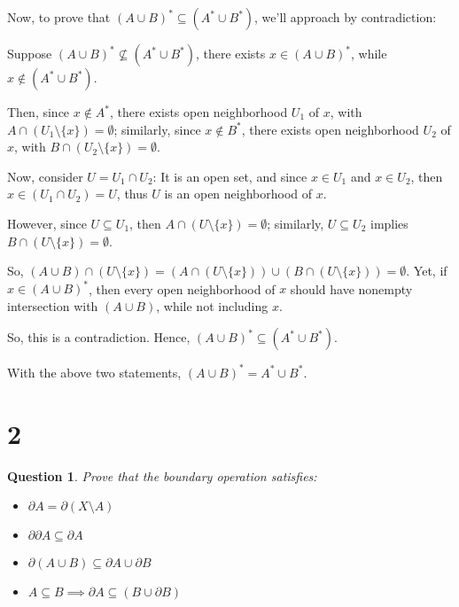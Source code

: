 \documentclass{article}
\newtheorem{question}{Question}
\begin{document}
\begin{itemize}
    \hfill

    Now, to prove that $(A\cup B)^* \subseteq (A^*\cup B^*)$, we'll approach by contradiction:

    Suppose $(A\cup B)^*\not\subseteq (A^*\cup B^*)$, there exists $x\in (A\cup B)^*$, while $x\notin (A^*\cup B^*)$.

    Then, since $x\notin A^*$, there exists open neighborhood $U_1$ of $x$, with $A\cap (U_1\setminus\{x\})=\emptyset$;
    similarly, since $x\notin B^*$, there exists open neighborhood $U_2$ of $x$, with $B\cap (U_2\setminus\{x\})=\emptyset$.

    Now, consider $U=U_1\cap U_2$: It is an open set, and since $x\in U_1$ and $x\in U_2$, then $x\in (U_1\cap U_2)=U$, thus $U$ is an open neighborhood of $x$.

    However, since $U\subseteq U_1$, then $A\cap (U\setminus\{x\})=\emptyset$; similarly, $U\subseteq U_2$ implies $B\cap (U\setminus\{x\})=\emptyset$.

    So, $(A\cup B)\cap (U\setminus\{x\})=(A\cap (U\setminus\{x\}))\cup (B\cap (U\setminus\{x\}))=\emptyset$. Yet, if $x\in (A\cup B)^*$, 
    then every open neighborhood of $x$ should have nonempty intersection with $(A\cup B)$, while not including $x$.

    So, this is a contradiction. Hence, $(A\cup B)^*\subseteq (A^*\cup B^*)$.

    \hfill

    With the above two statements, $(A\cup B)^*=A^*\cup B^*$.
\end{itemize}

\hfill

\hfill

\section*{2}
\begin{myBox}[]{}
    \begin{question}
        Prove that the boundary operation satisfies:
        \begin{itemize}
            \item $\partial A=\partial(X\setminus A)$
            \item $\partial\partial A\subseteq \partial A$
            \item $\partial(A\cup B)\subseteq \partial A\cup \partial B$
            \item $A\subseteq B\implies \partial A\subseteq (B\cup \partial B)$
        \end{itemize}
    \end{question}
\end{myBox}
\end{document}
